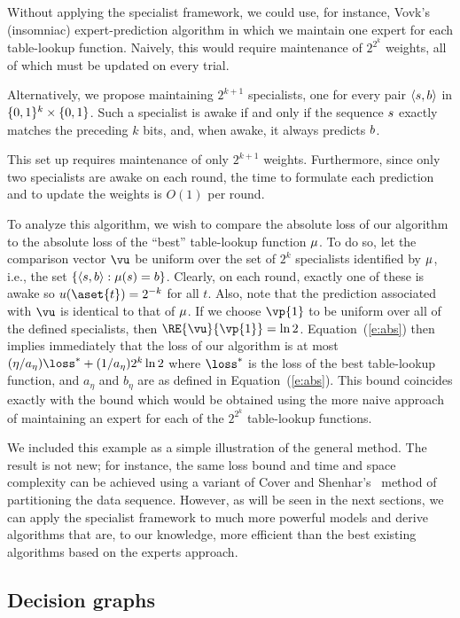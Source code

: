 Without applying the specialist framework, we could use, for instance,
Vovk's~\cite{Vovk90}
(insomniac) expert-prediction algorithm in which we maintain one
expert for each table-lookup function.
Naively, this would require maintenance of $2^{2^k}$ weights, all of
which must be updated on every trial.

Alternatively, we propose maintaining $2^{k+1}$ specialists, one for
every pair $\left\langle {s,b} \right\rangle$ in $\{0,1\}^k \times \{0,1\}$.
Such a specialist is awake if and only if the sequence $s$
exactly matches the preceding $k$ bits, and, when awake, it always
predicts $b$.

This set up requires maintenance of only $2^{k+1}$ weights.
Furthermore, since only two specialists are awake on each round, the
time to formulate each prediction and to update the weights is $O(1)$
per round.

To analyze this algorithm, we wish to compare the absolute loss
of our algorithm to the absolute loss of the ``best''
table-lookup function $\mu$.
To do so, let the comparison vector $\vu$ be uniform over the set of
$2^k$ specialists identified by $\mu$, i.e., the set
$\{\left\langle {s,b} \right\rangle : \mu(s) = b\}$.
Clearly, on each round, exactly one of these is awake so
$u(\aset{t})=2^{-k}$ for all $t$.
Also, note that the prediction associated with $\vu$ is identical to
that of $\mu$.
If we choose $\vp{1}$ to be uniform over all of the defined
specialists, then $\RE{\vu}{\vp{1}} = \ln 2$.
Equation~(\ref{e:abs}) then implies immediately that the loss of
our algorithm is at most
$ (\eta / a_\eta) \loss^*  + (1/a_\eta) 2^k \ln 2$
where $\loss^*$ is the loss of the best table-lookup function, and
$a_\eta$ and $b_\eta$ are as defined in Equation~(\ref{e:abs}).
This bound coincides exactly with the bound which would be obtained
using the more naive approach of maintaining an expert for each of the
$2^{2^k}$ table-lookup functions.

We included this example as a simple illustration of the general
method.  The result is not new; for instance, the same loss bound and
time and space complexity can be achieved using a variant of
Cover and Shenhar's~\cite{CoverSh77} method of partitioning the data sequence.  
However, as
will be seen in the next sections, we can apply the specialist
framework to much more powerful models and derive algorithms that are,
to our knowledge, more efficient than the best existing algorithms
based on the experts approach.

\subsection{Decision graphs}

